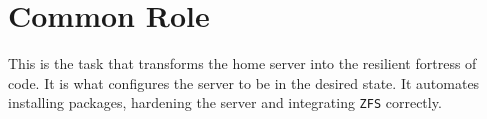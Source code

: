 \begin{center}
	\begin{minipage}{0.6\textwidth}
	\end{minipage}
\end{center}



\section{Common Role}
This is the task that transforms the home server into the resilient fortress of code. It is what configures the server to be in the desired state. It automates installing packages, hardening the server and integrating \texttt{ZFS} correctly.